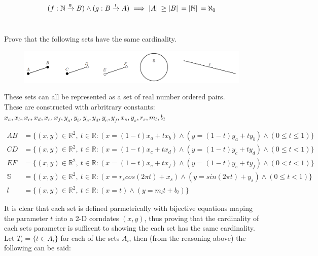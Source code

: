 \documentclass[]{article}
\newcommand{\R}{\mathbb{R}}
\newcommand{\N}{\mathbb{N}}
\newcommand{\toI}{\xrightarrow{\textsf{\tiny I}}}
\newcommand{\toB}{\xrightarrow{\textsf{\tiny B}}}
\begin{document}
\begin{displaymath}
	(f : \N \toB B) \land (g : B \toI A) \implies \abs*{A} \geq \abs*{B} = \abs*{\N} = \aleph_0
\end{displaymath}


\newpage
\section{}
Prove that the following sets have the same cardinality.
\begin{figure}[h]
	\centering
	\includegraphics[width=\textwidth]{fig/pblm6.png}
\end{figure}

These sets can all be represented as a set of real number ordered pairs.\\
These are constructed with arbritrary constants: 
$x_a,x_b,x_c,x_d,x_e,x_f,y_a,y_b,y_c,y_d,y_e,y_f,x_s,y_s,r_s,m_l,b_l$

\begin{align*}
	AB &= \{(x,y) \in \R^2, \ t \in \R : 
	(x = (1-t) x_a + t x_b) \land (y = (1-t) y_a + t y_b)
	\land (0 \leq t \leq 1)\}\\
	CD &= \{(x,y) \in \R^2, \ t \in \R : 
	(x = (1-t) x_c + t x_d) \land (y = (1-t) y_c + t y_d)
	\land (0 \leq t < 1)\}\\
	EF &= \{(x,y) \in \R^2, \ t \in \R : 
	(x = (1-t) x_e + t x_f) \land (y = (1-t) y_e + t y_f)
	\land (0 < t < 1)\}\\
	\mathbb{S} &= \{(x,y) \in \R^2, \ t \in \R : 
	(x = r_s cos(2 \pi t) + x_s) \land (y = sin(2 \pi t) + y_s)
	\land (0 \leq t < 1)\}\\
	\mathit{l} &= \{(x,y) \in \R^2, \ t \in \R: (x = t) \land (y = m_l t + b_l)\}
\end{align*}

It is clear that each set is defined parmetrically with bijective equations maping 
the parameter $t$ into a 2-D corndates $(x,y)$, thus proving that the cardinality 
of each sets parameter is sufficent to showing the each set has the same cardinality.\\

Let $T_i = \{t \in A_i\}$ for each of the sets $A_i$, then (from the reasoning above) 
the following can be said:
\end{document}
